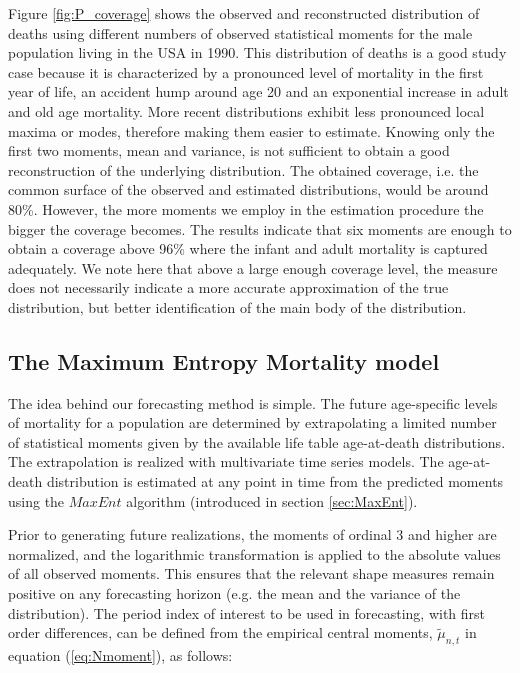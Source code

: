 \documentclass[T0_MEM]{subfiles}
\begin{document}
Figure \ref{fig:P_coverage} shows the observed and reconstructed distribution of deaths using different numbers of observed statistical moments for the male population living in the USA in 1990. This distribution of deaths is a good study case because it is characterized by a pronounced level of mortality in the first year of life, an accident hump around age 20 and an exponential increase in adult and old age mortality. More recent distributions exhibit less pronounced local maxima or modes, therefore making them easier to estimate. Knowing only the first two moments, mean and variance, is not sufficient to obtain a good reconstruction of the underlying distribution. The obtained coverage, i.e. the common surface of the observed and estimated distributions, would be around 80\%. However, the more moments we employ in the estimation procedure the bigger the coverage becomes. The results indicate that six moments are enough to obtain a coverage above 96\% where  the infant and adult mortality is captured adequately. We note here that above a large enough coverage level, the measure does not necessarily indicate a more accurate approximation of the true distribution, but better identification of the main body of the distribution.

\subsection{The Maximum Entropy Mortality model}\label{sec:MEM}

The idea behind our forecasting method is simple. The future age-specific levels of mortality for a population are determined by extrapolating a limited number of statistical moments given by the available life table age-at-death distributions. The extrapolation is realized with multivariate time series models. The age-at-death distribution is estimated at any point in time from the predicted moments using the $MaxEnt$ algorithm (introduced in section \ref{sec:MaxEnt}).

Prior to generating future realizations, the moments of ordinal 3 and higher are normalized, and the logarithmic transformation is applied to the absolute values of all observed moments. This ensures that the relevant shape measures remain positive on any forecasting horizon (e.g. the mean and the variance of the distribution). The period index of interest to be used in forecasting, with first order differences, can be defined from the empirical central moments, $\tilde{\mu}_{n,t}$ in equation (\ref{eq:Nmoment}), as follows:
\end{document}
